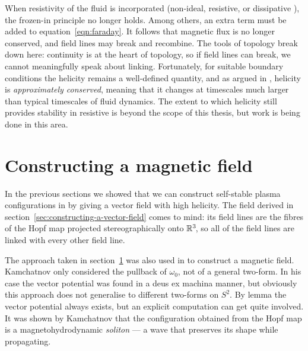When resistivity of the fluid is incorporated (non-ideal, resistive, or dissipative \mhd),
the frozen-in principle no longer holds.
Among others, an extra term must be added to equation~\ref{eqn:faraday}.
\parencite[p.~162]{goedbloed2004}
It follows that magnetic flux is no longer conserved,
and field lines may break and recombine.
The tools of topology break down here:
continuity is at the heart of topology,
so if field lines can break,
we cannot meaningfully speak about linking.
Fortunately, for suitable boundary conditions the helicity remains a well-defined quantity,
and as argued in \parencite{taylor1974},
helicity is \emph{approximately conserved},
meaning that it changes at timescales much larger
than typical timescales of fluid dynamics.
The extent to which helicity still provides stability in resistive \mhd
is beyond the scope of this thesis,
but work is being done in this area.

\section{Constructing a magnetic field}
\label{sec:constructing-a-magnetic-field}
In the previous sections we showed that we can construct
self-stable plasma configurations in \mhd
by giving a vector field with high helicity.
The field derived in section~\ref{sec:constructing-a-vector-field} comes to mind:
its field lines are the fibres of the Hopf map
projected stereographically onto $\mathbb{R}^3\!$,
so all of the field lines are linked with every other field line.

The approach taken in section~\ref{sec:constructing-a-magnetic-field}
was also used in \parencite{kamchatnov1982} to construct a magnetic field.
Kamchatnov only considered the pullback of $\omega_0$,
not of a general two-form.
In his case the vector potential was found in a deus ex machina manner,
but obviously this approach does not generalise to different two-forms on $S^2\!$.
By \poincares lemma the vector potential always exists,
but an explicit computation can get quite involved.
It was shown by Kamchatnov that the configuration obtained from the Hopf map
is a magnetohydrodynamic \emph{soliton}
— a wave that preserves its shape while propagating.

